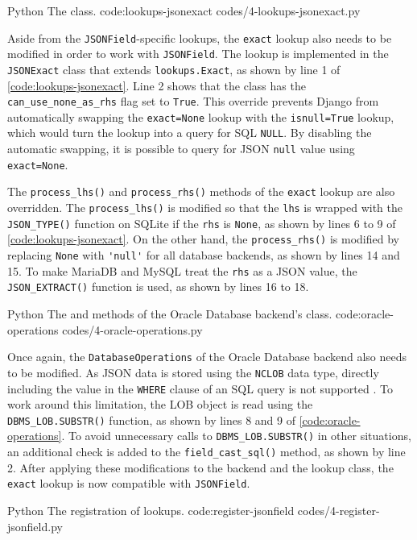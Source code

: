 \listing
{Python}
{The  class.}
{code:lookups-jsonexact}
{codes/4-lookups-jsonexact.py}

Aside from the \verb|JSONField|-specific lookups, the \verb|exact| lookup also
needs to be modified in order to work with \verb|JSONField|. The lookup is
implemented in the \verb|JSONExact| class that extends \verb|lookups.Exact|, as
shown by line 1 of \autoref{code:lookups-jsonexact}. Line 2 shows that the
class has the \verb|can_use_none_as_rhs| flag set to \verb|True|. This override
prevents Django from automatically swapping the \verb|exact=None| lookup with
the \verb|isnull=True| lookup, which would turn the lookup into a query for SQL
\verb|NULL|. By disabling the automatic swapping, it is possible to query for
JSON \verb|null| value using \verb|exact=None|.

The \verb|process_lhs()| and \verb|process_rhs()| methods of the \verb|exact|
lookup are also overridden. The \verb|process_lhs()| is modified so that the
\verb|lhs| is wrapped with the \verb|JSON_TYPE()| function on SQLite if the
\verb|rhs| is \verb|None|, as shown by lines 6 to 9 of
\autoref{code:lookups-jsonexact}. On the other hand, the \verb|process_rhs()|
is modified by replacing \verb|None| with \verb|'null'| for all database
backends, as shown by lines 14 and 15. To make MariaDB and MySQL treat the
\verb|rhs| as a JSON value, the \verb|JSON_EXTRACT()| function is used, as
shown by lines 16 to 18.

\listing
{Python}
{The  and  methods of the
Oracle Database backend's  class.}
{code:oracle-operations}
{codes/4-oracle-operations.py}

Once again, the \verb|DatabaseOperations| of the Oracle Database backend also
needs to be modified. As JSON data is stored using the \verb|NCLOB| data type,
directly including the value in the \verb|WHERE| clause of an SQL query is not
supported \cite{oracle:comparison}. To work around this limitation, the LOB
object is read using the \verb|DBMS_LOB.SUBSTR()| function, as shown by lines 8
and 9 of \autoref{code:oracle-operations}. To avoid unnecessary calls to
\verb|DBMS_LOB.SUBSTR()| in other situations, an additional check is added to
the \verb|field_cast_sql()| method, as shown by line 2. After applying these
modifications to the backend and the lookup class, the \verb|exact| lookup is
now compatible with \verb|JSONField|.

\listing
{Python}
{The registration of  lookups.}
{code:register-jsonfield}
{codes/4-register-jsonfield.py}

